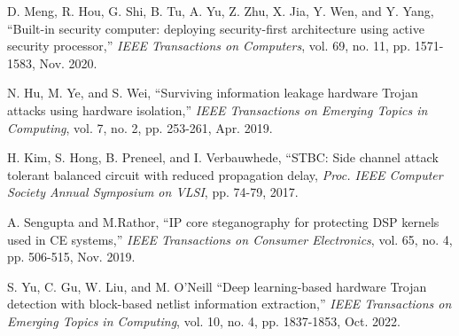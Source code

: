\documentclass[10pt,journal, compsoc]{IEEEtran}
\begin{document}
\begin{thebibliography}{99}

D. Meng, R. Hou, G. Shi, B. Tu, A. Yu, Z. Zhu, X. Jia, Y. Wen, and Y. Yang, ``Built-in security computer: deploying security-first architecture using active security processor,'' \textit{IEEE Transactions on Computers}, vol. 69, no. 11, pp. 1571-1583, Nov. 2020.

N. Hu, M. Ye, and S. Wei, ``Surviving information leakage hardware Trojan attacks using hardware isolation,'' \textit{IEEE Transactions on Emerging Topics in Computing}, vol. 7, no. 2, pp. 253-261, Apr. 2019.



H. Kim, S. Hong, B. Preneel, and I. Verbauwhede, ``STBC: Side channel attack tolerant balanced circuit with reduced propagation delay, \textit{Proc. IEEE Computer Society Annual Symposium on VLSI}, pp. 74-79, 2017.



A. Sengupta and M.Rathor, ``IP core steganography for protecting DSP kernels used in CE systems,'' \textit{IEEE Transactions on Consumer Electronics}, vol. 65, no. 4, pp. 506-515, Nov. 2019.

S. Yu, C. Gu, W. Liu, and M. O'Neill ``Deep learning-based hardware Trojan detection with block-based netlist information extraction,'' \textit{IEEE Transactions on Emerging Topics in Computing}, vol. 10, no. 4, pp. 1837-1853, Oct. 2022.


\end{thebibliography}
\end{document}
